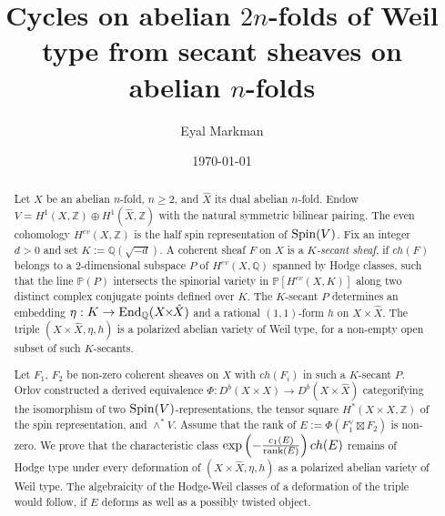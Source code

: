 \documentclass[12pt]{amsart}
\numberwithin{equation}{subsection}
\theoremstyle{plain}
\theoremstyle{definition}
\newcommand{\QQ}{{\mathbb Q}}
\newcommand{\ZZ}{{\mathbb Z}}
\newcommand{\PP}{{\mathbb P}}
\newcommand{\Spin}{{\rm Spin}}
\newcommand{\rank}{{\rm rank}}
\newcommand{\End}{{\rm End}}
\begin{document}
\title[Abelian $2n$-folds of Weil type]
{Cycles on abelian $2n$-folds of Weil type from secant sheaves on abelian $n$-folds}
\author{Eyal Markman}
\address{Department of Mathematics and Statistics, 
University of Massachusetts, Amherst, MA 01003, USA}

\date{\today}

\begin{abstract}
Let $X$ be an abelian $n$-fold, $n\geq 2$,  and $\hat{X}$ its dual abelian $n$-fold. 
Endow $V\!\!=\!\!H^1(X,\ZZ)\!\oplus \! H^1(\hat{X},\ZZ)$ with the natural symmetric bilinear pairing.
The even cohomology $H^{ev}(X,\ZZ)$ is the half spin representation of $\Spin(V)$. 
Fix an integer $d>0$ and set $K\!:=\!\QQ(\sqrt{-d})$.
A coherent sheaf $F$ on $X$ is a {\em $K$-secant sheaf}, if $ch(F)$ belongs to a $2$-dimensional subspace
$P$ of $H^{ev}(X,\QQ)$ spanned by Hodge classes, such that the line $\PP(P)$ intersects the spinorial variety in
$\PP[H^{ev}(X,K)]$ 
along two distinct complex conjugate points defined over $K$. The $K$-secant  $P$ determines an embedding  
$\eta:K\rightarrow \End_\QQ(X\!\!\times\!\!\hat{X})$ and a rational $(1,1)$-form $h$ on $X\!\!\times\!\!\hat{X}$. The triple $(X\!\!\times\!\!\hat{X},\eta,h)$ is a polarized abelian variety of Weil type, for a non-empty open subset of such $K$-secants.

Let $F_1$, $F_2$ be non-zero coherent sheaves on $X$ with $ch(F_i)$ in such a $K$-secant $P$. 
Orlov constructed a derived equivalence 
$
\Phi:D^b(X\!\!\times\!\! X)\rightarrow D^b(X\!\!\times\!\!\hat{X})
$ 
categorifying  the isomorphism of two $\Spin(V)$-representations,
the tensor square $H^*(X\!\!\times\!\! X,\ZZ)$ 
of the spin  representation, 
and $\wedge^*V$. Assume that the rank of $E:=\Phi(F_1^\vee\boxtimes F_2)$ is non-zero.
We prove that the characteristic class $\exp\left(-\frac{c_1(E)}{\rank(E)}\right)ch(E)$ 
remains of Hodge type under every deformation of 
$(X\!\!\times\!\!\hat{X},\eta,h)$ as a polarized abelian variety of Weil type.  The algebraicity of the Hodge-Weil classes of a deformation of the triple would follow, if $E$ deforms as well as a possibly twisted object.


\end{abstract}
\end{document}
